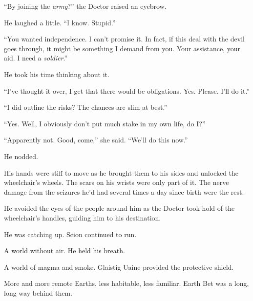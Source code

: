 ``By joining the \emph{army}?'' the Doctor raised an eyebrow.



He laughed a little.  ``I know.  Stupid.''



``You wanted independence.  I can't promise it.  In fact, if this deal with the devil goes through, it might be something I demand from you.  Your assistance, your aid.  I need a \emph{soldier}.''



He took his time thinking about it.



``I've thought it over, I get that there would be obligations.  Yes.  Please.  I'll do it.''



``I did outline the risks?  The chances are slim at best.''



``Yes.  Well, I obviously don't put much stake in my own life, do I?''



``Apparently not.  Good, come,'' she said.  ``We'll do this now.''



He nodded.



His hands were stiff to move as he brought them to his sides and unlocked the wheelchair's wheels.  The scars on his wrists were only part of it.  The nerve damage from the seizures he'd had several times a day since birth were the rest.



He avoided the eyes of the people around him as the Doctor took hold of the wheelchair's handles, guiding him to his destination.



\sectionbreak






He was catching up.  Scion continued to run.



A world without air.  He held his breath.



A world of magma and smoke.  Glaistig Uaine provided the protective shield.



More and more remote Earths, less habitable, less familiar.  Earth Bet was a long, long way behind them.



